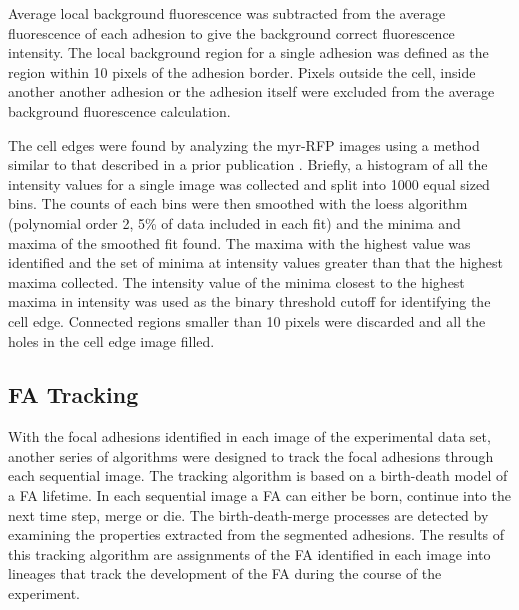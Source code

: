 \documentclass[10pt]{article}
\begin{document}
Average local background fluorescence was subtracted from the average
fluorescence of each adhesion to give the background correct fluorescence
intensity. The local background region for a single adhesion was defined as the
region within 10 pixels of the adhesion border. Pixels outside the cell, inside
another another adhesion or the adhesion itself were excluded from the average
background fluorescence calculation.

The cell edges were found by analyzing the myr-RFP images using a method similar
to that described in a prior publication \cite{Machacek06}. Briefly, a histogram
of all the intensity values for a single image was collected and split into 1000
equal sized bins. The counts of each bins were then smoothed with the loess
algorithm \cite{Cleveland79} (polynomial order 2, 5\% of data included in each
fit) and the minima and maxima of the smoothed fit found. The maxima with the
highest value was identified and the set of minima at intensity values greater
than that the highest maxima collected. The intensity value of the minima
closest to the highest maxima in intensity was used as the binary threshold
cutoff for identifying the cell edge. Connected regions smaller than 10 pixels
were discarded and all the holes in the cell edge image filled.

\subsection*{FA Tracking}

With the focal adhesions identified in each image of the experimental data set,
another series of algorithms were designed to track the focal adhesions through
each sequential image. The tracking algorithm is based on a birth-death model of
a FA lifetime. In each sequential image a FA can either be born, continue into
the next time step, merge or die. The birth-death-merge processes are detected
by examining the properties extracted from the segmented adhesions. The results
of this tracking algorithm are assignments of the FA identified in each image
into lineages that track the development of the FA during the course of the
experiment.
\end{document}
